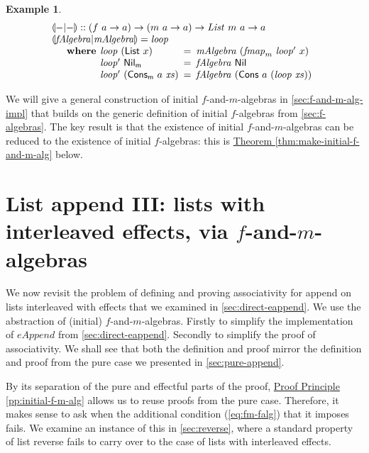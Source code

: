\documentclass{jfp1}
\newcommand{\eFold}[2]{\llparenthesis #1|#2 \rrparenthesis}
\newtheorem{example}{Example}
\newcommand{\proofprinref}[1]{\hyperref[#1]{Proof Principle \ref*{#1}}}
\newcommand{\thmref}[1]{\hyperref[#1]{Theorem \ref*{#1}}}
\newcommand{\kw}[1]{\textbf{#1}}
\begin{document}
\begin{example}
\begin{displaymath}
\begin{array}{l}
      \eFold{-}{-} :: (f~a \to a) \to (m~a \to a) \to \mathit{List}~m~a \to a \\
      \eFold{\mathit{fAlgebra}}{\mathit{mAlgebra}} = \mathit{loop} \\
      \quad\begin{array}{r@{\hspace{0.4em}}l@{\hspace{0.5em}}c@{\hspace{0.5em}}l}
        \kw{where} & \mathit{loop}~(\mathsf{List}~x) &=& \mathit{mAlgebra}~(\mathit{fmap}_m~\mathit{loop'}~x) \\
        & \mathit{loop'}~\mathsf{Nil_m}& = & \mathit{fAlgebra}~\mathsf{Nil} \\
        & \mathit{loop'}~(\mathsf{Cons_m}~a~\mathit{xs}) &=& \mathit{fAlgebra}~(\mathsf{Cons}~a~(\mathit{loop}~\mathit{xs}))
      \end{array}
    \end{array}
  \end{displaymath}
\end{example}
We will give a general construction of initial $f$-and-$m$-algebras in
\autoref{sec:f-and-m-alg-impl} that builds on the generic definition
of initial $f$-algebras from \autoref{sec:f-algebras}. The key result
is that the existence of initial $f$-and-$m$-algebras can be reduced
to the existence of initial $f$-algebras: this is
\thmref{thm:make-initial-f-and-m-alg} below.

\section{List append III: lists with interleaved effects, via $f$-and-$m$-algebras}
\label{sec:f-and-m-append}

We now revisit the problem of defining and proving associativity for
append on lists interleaved with effects that we examined in
\autoref{sec:direct-eappend}. We use the abstraction of (initial)
$f$-and-$m$-algebras. Firstly to simplify the implementation of
$\mathit{eAppend}$ from \autoref{sec:direct-eappend}. Secondly to
simplify the proof of associativity. We shall see that both the
definition and proof mirror the definition and proof from the
pure case we presented in \autoref{sec:pure-append}.

By its separation of the pure and effectful parts of the proof,
\proofprinref{pp:initial-f-m-alg} allows us to reuse proofs from the
pure case. Therefore, it makes sense to ask when the additional
condition (\autoref{eq:fm-falg}) that it imposes fails. We examine an
instance of this in \autoref{sec:reverse}, where a standard property
of list reverse fails to carry over to the case of lists with
interleaved effects.
\end{document}
